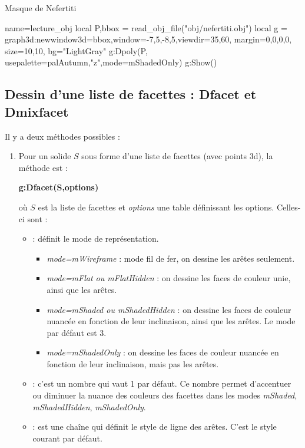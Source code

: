 \begin{demo}{Masque de Nefertiti}
\begin{luadraw}{name=lecture_obj}
local P,bbox = read_obj_file("obj/nefertiti.obj")
local g = graph3d:new{window3d=bbox,window={-7,5,-8,5},viewdir={35,60},
    margin={0,0,0,0}, size={10,10}, bg="LightGray"}
g:Dpoly(P, {usepalette={palAutumn,"z"},mode=mShadedOnly})
g:Show() 
\end{luadraw}
\end{demo}


\subsection{Dessin d'une liste de facettes : Dfacet et Dmixfacet}

Il y a deux méthodes possibles :
\begin{enumerate}
    \item Pour un solide $S$ sous forme d'une liste de facettes (avec points 3d), la méthode est :
    \par\hfil\textbf{g:Dfacet(S,options)}\hfil\par
    où $S$ est la liste de facettes et \emph{options} une table définissant les options. Celles-ci sont :
    \begin{itemize}
        \item {} : définit le mode de représentation.
            \begin{itemize}
                \item \emph{mode=mWireframe} : mode fil de fer, on dessine les arêtes seulement.
                \item \emph{mode=mFlat ou mFlatHidden} : on dessine les faces de couleur unie, ainsi que les arêtes.
                \item \emph{mode=mShaded ou mShadedHidden} : on dessine les faces de couleur nuancée en fonction de leur inclinaison, ainsi que les arêtes. Le mode par défaut est 3.
                \item \emph{mode=mShadedOnly} :  on dessine les faces de couleur nuancée en fonction de leur inclinaison, mais pas les arêtes.
            \end{itemize}
        \item {} : c'est un nombre qui vaut 1 par défaut. Ce nombre permet d'accentuer ou diminuer la nuance des couleurs des facettes dans les modes \emph{mShaded}, \emph{mShadedHidden}, \emph{mShadedOnly}.
        \item {} : est une chaîne qui définit le style de ligne des arêtes. C'est le style courant par défaut.

\end{itemize}
\end{enumerate}
